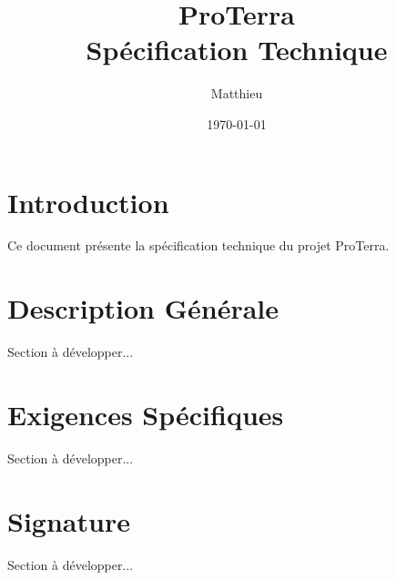 \documentclass[12pt,a4paper]{article}
\title{ProTerra\\Spécification Technique}
\author{Matthieu}
\date{\today}
\begin{document}
\maketitle
\newpage

\tableofcontents
\newpage

\section{Introduction}
Ce document présente la spécification technique du projet ProTerra.

% 
% 
% 
% 

\section{Description Générale}
Section à développer...

\section{Exigences Spécifiques}
Section à développer...

\section{Signature}
Section à développer...
\end{document}

